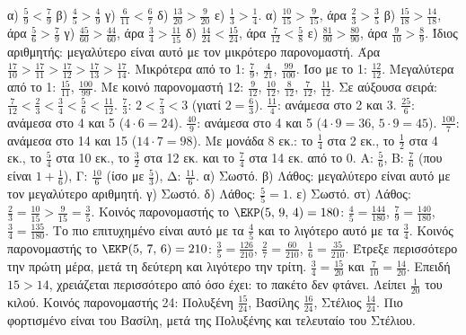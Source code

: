  α) $\frac{5}{9}<\frac{7}{9}$ \quad β) $\frac{4}{5}>\frac{4}{9}$ \quad γ) $\frac{6}{11}<\frac{6}{7}$ \quad δ) $\frac{13}{20}>\frac{9}{20}$ \quad ε) $\frac{1}{3}>\frac{1}{4}$.
 α) $\frac{10}{15}>\frac{9}{15}$, άρα $\frac{2}{3}>\frac{3}{5}$ \quad β) $\frac{15}{18}>\frac{14}{18}$, άρα $\frac{5}{6}>\frac{7}{9}$ \quad γ) $\frac{45}{60}>\frac{44}{60}$, άρα $\frac{3}{4}>\frac{11}{15}$ \quad δ) $\frac{14}{24}<\frac{15}{24}$, άρα $\frac{7}{12}<\frac{5}{8}$ \quad ε) $\frac{81}{90}>\frac{80}{90}$, άρα $\frac{9}{10}>\frac{8}{9}$.
 Ίδιος αριθμητής: μεγαλύτερο είναι αυτό με τον μικρότερο παρονομαστή. Άρα $\frac{17}{10}>\frac{17}{11}>\frac{17}{12}>\frac{17}{13}>\frac{17}{14}$.
 Μικρότερα από το 1: $\frac{7}{9}$, $\frac{4}{21}$, $\frac{99}{100}$. Ίσο με το 1: $\frac{12}{12}$. Μεγαλύτερα από το 1: $\frac{15}{11}$, $\frac{100}{99}$.
 Με κοινό παρονομαστή 12: $\frac{9}{12}$, $\frac{10}{12}$, $\frac{8}{12}$, $\frac{7}{12}$, $\frac{11}{12}$. Σε αύξουσα σειρά: $\frac{7}{12}<\frac{2}{3}<\frac{3}{4}<\frac{5}{6}<\frac{11}{12}$.
 $\frac{7}{3}$: $2<\frac{7}{3}<3$ (γιατί $2=\frac{6}{3}$). $\frac{11}{4}$: ανάμεσα στο 2 και 3. $\frac{25}{6}$: ανάμεσα στο 4 και 5 ($4\cdot 6=24$). $\frac{40}{9}$: ανάμεσα στο 4 και 5 ($4\cdot 9=36$, $5\cdot 9=45$). $\frac{100}{7}$: ανάμεσα στο 14 και 15 ($14\cdot 7=98$).
 Με μονάδα 8 εκ.: το $\frac{1}{4}$ στα 2 εκ., το $\frac{1}{2}$ στα 4 εκ., το $\frac{5}{4}$ στα 10 εκ., το $\frac{3}{2}$ στα 12 εκ. και το $\frac{7}{4}$ στα 14 εκ. από το 0.
 Α: $\frac{5}{6}$, Β: $\frac{7}{6}$ (που είναι $1+\frac{1}{6}$), Γ: $\frac{10}{6}$ (ίσο με $\frac{5}{3}$), Δ: $\frac{11}{6}$.
 α) Σωστό. β) Λάθος: μεγαλύτερο είναι αυτό με τον μεγαλύτερο αριθμητή. γ) Σωστό. δ) Λάθος: $\frac{5}{5}=1$. ε) Σωστό. στ) Λάθος: $\frac{2}{3}=\frac{10}{15}>\frac{9}{15}=\frac{3}{5}$.
 Κοινός παρονομαστής το $\EKP(5,\,9,\,4)=180$: $\frac{4}{5}=\frac{144}{180}$, $\frac{7}{9}=\frac{140}{180}$, $\frac{3}{4}=\frac{135}{180}$. Το πιο επιτυχημένο είναι αυτό με τα $\frac{4}{5}$ και το λιγότερο αυτό με τα $\frac{3}{4}$.
 Κοινός παρονομαστής το $\EKP(5,\,7,\,6)=210$: $\frac{3}{5}=\frac{126}{210}$, $\frac{2}{7}=\frac{60}{210}$, $\frac{1}{6}=\frac{35}{210}$. Έτρεξε περισσότερο την πρώτη μέρα, μετά τη δεύτερη και λιγότερο την τρίτη.
 $\frac{3}{4}=\frac{15}{20}$ και $\frac{7}{10}=\frac{14}{20}$. Επειδή $15>14$, χρειάζεται περισσότερο από όσο έχει: το πακέτο δεν φτάνει. Λείπει $\frac{1}{20}$ του κιλού.
 Κοινός παρονομαστής 24: Πολυξένη $\frac{15}{24}$, Βασίλης $\frac{16}{24}$, Στέλιος $\frac{14}{24}$. Πιο φορτισμένο είναι του Βασίλη, μετά της Πολυξένης και τελευταίο του Στέλιου.
